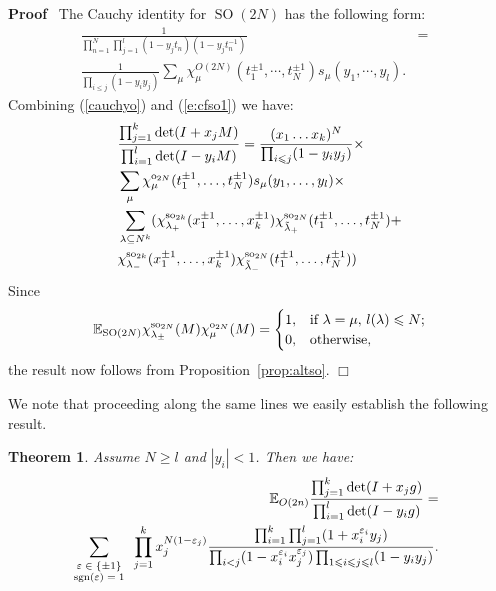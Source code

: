 \documentclass[11pt]{amsart}
\newcommand{\tmop}[1]{\ensuremath{\operatorname{#1}}}
\renewenvironment{proof}{
\noindent\textbf{Proof}\ }{\hspace*{\fill}
\begin{math}\Box\end{math}\medskip}
\newtheorem{theorem}{Theorem}
\newcommand{\tmscript}[1]{\text{\scriptsize $#1$}}
\newcommand{\SO}{{\rm SO}}
\newcommand{\so}{{\rm so}}
\renewcommand{\o}{{\rm o}}
\begin{document}
\begin{proof}
  The Cauchy identity for $\tmop{SO} ( 2 N )$ has the following form:
  \begin{eqnarray}
    \frac{1}{\prod_{n = 1}^N \prod_{j = 1}^l ( 1 - y_j t_n ) ( 1 - y_j t_n^{-
    1} )} & = & \nonumber\\
    \frac{1}{\prod_{i \leqslant j} ( 1 - y_i y_j )} \sum_{\mu} \chi_{\mu}^{O (
    2 N )} ( t_1^{\pm 1}, \cdots, t_N^{\pm 1} ) s_{\mu} ( y_1, \cdots, y_l ) .
    &  &\label{cauchyo}
  \end{eqnarray}
  Combining (\ref{cauchyo}) and (\ref{e:cfso1}) we have:
  \begin{equation*}
\begin{aligned}
&\frac{\prod_{j=1}^k \det (I+x_j M)}{\prod_{i=1}^l \det (I-y_i
M)}= \frac{(x_1 \dots x_k)^{N}}{\prod_{i\leqslant j}(1-y_i y_j)}
\times
\\&\sum_{\mu}\chi_{\mu}^{\o_{2N}}(t_1^{\pm 1}, \dots, t_N^{\pm 1})
s_{\mu}(y_1, \dots, y_l) \times\\ &\sum_{\lambda \subseteq N^{k}}(
\chi_{\lambda_{+}}^{\so_{2k}}(x_{1}^{\pm 1}, \dots, x_{k}^{\pm 1})
\chi_{\tilde{\lambda}_{+}}^{\so_{2N}}(t_1^{\pm 1},
\dots, t_N^{\pm 1})+\\
& \chi_{\lambda_{-}}^{\so_{2k}}(x_{1}^{\pm 1}, \dots, x_{k}^{\pm
1}) \chi_{\tilde{\lambda}_{-}}^{\so_{2N}}(t_1^{\pm 1}, \dots,
t_N^{\pm 1}))
\end{aligned}
\end{equation*}
  Since
\begin{equation}
\mathbb{E}_{\SO(2N)} \chi_{\lambda_{\pm}}^{\so_{2N}}(M)
\chi_{\mu}^{\o_{2N}}(M) =
\begin{cases} 1, &\text{if $\lambda = \mu,\, l(\lambda) \leqslant N$;}\\
0, &\text{otherwise},
\end{cases}
\end{equation}
  the result now follows from Proposition~\ref{prop:altso}.
\end{proof}

We note that proceeding along the same lines we easily establish
the following result.

\begin{theorem}
  \label{thm:o1}Assume $N \geqslant l$ and $|y_i| <1$. Then we
  have:
  \begin{eqnarray*}
     \mathbb{E}_{O ( 2 n )} \frac{\prod_{j = 1}^k \det ( I + x_j g
    )}{\prod_{i = 1}^l \det ( I - y_i g )} = & &\\
    \sum_{\tmscript{\begin{array}{c}
      \varepsilon \in \{ \pm 1 \}\\
      \tmop{sgn} ( \varepsilon ) = 1
    \end{array}}} \prod_{j = 1}^k x_j^{N ( 1 - \varepsilon_j )} \frac{\prod_{i
    = 1}^k \prod_{j = 1}^l ( 1 + x_i^{\varepsilon_i} y_j )}{\prod_{i < j} ( 1
    - x_i^{\varepsilon_i} x_j^{\varepsilon_j} ) \prod_{1 \leqslant i \leqslant
    j \leqslant l} ( 1 - y_i y_j )} . & &
  \end{eqnarray*}
\end{theorem}
\end{document}
